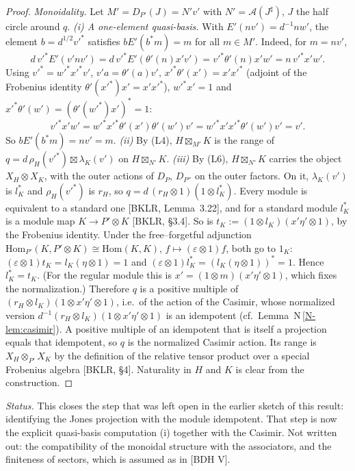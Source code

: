 \documentclass[11pt]{article}
\theoremstyle{definition}
\theoremstyle{remark}
\newcommand{\cA}{\mathcal A}
\newcommand{\fus}{\boxtimes}
\newcommand{\nref}[1]{N\,\ref{N-#1}}
\begin{document}
\begin{proof}
\emph{Monoidality.} Let $M'=D_{P'}(J)=N'v'$ with $N'=\cA(J^\sharp)$, $J$ the half circle around $q$. \emph{(i) A one-element quasi-basis.} With $E'(nv')=d^{-1}nw'$, the element $b=d^{1/2}v'^*$ satisfies $bE'(b^*m)=m$ for all $m\in M'$. Indeed, for $m=nv'$,
\[
d\,v'^*E'(v'nv')=d\,v'^*E'(\theta'(n)x'v')=v'^*\theta'(n)x'w'=n\,v'^*x'w'.
\]
Using $v'^*=w'^*x'^*v'$, $v'a=\theta'(a)v'$, $x'^*\theta'(x')=x'x'^*$ (adjoint of the Frobenius identity $\theta'(x'^*)x'=x'x'^*$), $w'^*x'=1$ and $x'^*\theta'(w')=(\theta'(w'^*)x')^*=1$:
\[
v'^*x'w'=w'^*x'^*\theta'(x')\theta'(w')v'=w'^*x'x'^*\theta'(w')v'=v'.
\]
So $bE'(b^*m)=nv'=m$. \emph{(ii)} By (L4), $H\fus_{M'}K$ is the range of $q=d\,\rho_H(v'^*)\fus\lambda_K(v')$ on $H\fus_{N'}K$. \emph{(iii)} By (L6), $H\fus_{N'}K$ carries the object $X_H\otimes X_K$, with the outer actions of $D_P$, $D_{P''}$ on the outer factors. On it, $\lambda_K(v')$ is $l_K^*$ and $\rho_H(v'^*)$ is $r_H$, so $q=d\,(r_H\otimes1)(1\otimes l_K^*)$. Every module is equivalent to a standard one [BKLR, Lemma~3.22], and for a standard module $l_K^*$ is a module map $K\to P'\otimes K$ [BKLR, \S3.4]. So is $t_K:=(1\otimes l_K)(x'\eta'\otimes1)$, by the Frobenius identity. Under the free--forgetful adjunction $\mathrm{Hom}_{P'}(K,P'\otimes K)\cong\mathrm{Hom}(K,K)$, $f\mapsto(\varepsilon\otimes1)f$, both go to $1_K$: $(\varepsilon\otimes1)t_K=l_K(\eta\otimes1)=1$ and $(\varepsilon\otimes1)l_K^*=(l_K(\eta\otimes1))^*=1$. Hence $l_K^*=t_K$. (For the regular module this is $x'=(1\otimes m)(x'\eta'\otimes1)$, which fixes the normalization.) Therefore $q$ is a positive multiple of $(r_H\otimes l_K)(1\otimes x'\eta'\otimes1)$, i.e.\ of the action of the Casimir, whose normalized version $d^{-1}(r_H\otimes l_K)(1\otimes x'\eta'\otimes1)$ is an idempotent (cf.\ Lemma~\nref{lem:casimir}). A positive multiple of an idempotent that is itself a projection equals that idempotent, so $q$ is the normalized Casimir action. Its range is $X_H\otimes_{P'}X_K$ by the definition of the relative tensor product over a special Frobenius algebra [BKLR, \S4]. Naturality in $H$ and $K$ is clear from the construction.
\end{proof}
\emph{Status.} This closes the step that was left open in the earlier sketch of this result: identifying the Jones projection with the module idempotent. That step is now the explicit quasi-basis computation (i) together with the Casimir. Not written out: the compatibility of the monoidal structure with the associators, and the finiteness of sectors, which is assumed as in [BDH V].
\end{document}
